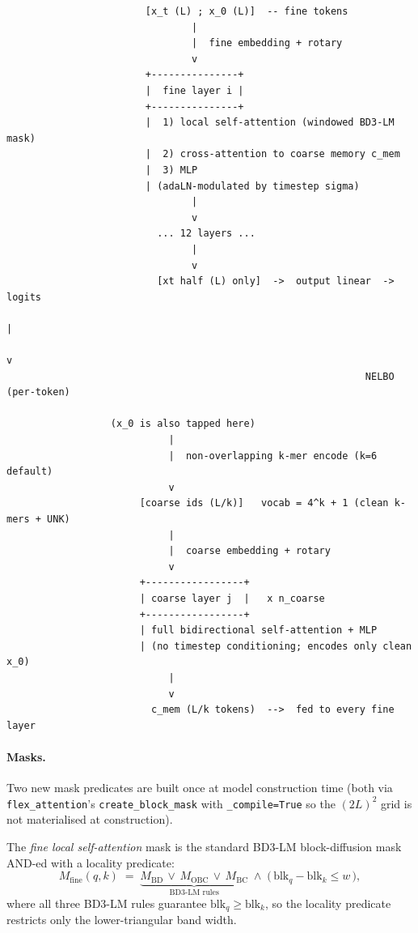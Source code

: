 \documentclass[11pt,a4paper]{article}
\begin{document}
\begin{lstlisting}
                        [x_t (L) ; x_0 (L)]  -- fine tokens
                                |
                                |  fine embedding + rotary
                                v
                        +---------------+
                        |  fine layer i |
                        +---------------+
                        |  1) local self-attention (windowed BD3-LM mask)
                        |  2) cross-attention to coarse memory c_mem
                        |  3) MLP
                        | (adaLN-modulated by timestep sigma)
                                |
                                v
                          ... 12 layers ...
                                |
                                v
                          [xt half (L) only]  ->  output linear  ->  logits
                                                                       |
                                                                       v
                                                              NELBO (per-token)

                  (x_0 is also tapped here)
                            |
                            |  non-overlapping k-mer encode (k=6 default)
                            v
                       [coarse ids (L/k)]   vocab = 4^k + 1 (clean k-mers + UNK)
                            |
                            |  coarse embedding + rotary
                            v
                       +-----------------+
                       | coarse layer j  |   x n_coarse
                       +-----------------+
                       | full bidirectional self-attention + MLP
                       | (no timestep conditioning; encodes only clean x_0)
                            |
                            v
                         c_mem (L/k tokens)  -->  fed to every fine layer
\end{lstlisting}

\paragraph{Masks.} Two new mask predicates are built once at model
construction time (both via \texttt{flex\_attention}'s
\texttt{create\_block\_mask} with \texttt{\_compile=True} so the
\((2L)^2\) grid is not materialised at construction).

The \emph{fine local self-attention} mask is the standard BD3-LM
block-diffusion mask AND-ed with a locality predicate:
\[
M_{\text{fine}}(q,k) \;=\;
\underbrace{
   M_{\text{BD}} \,\vee\, M_{\text{OBC}} \,\vee\, M_{\text{BC}}
 }_{\text{BD3-LM rules}}
\;\wedge\;
\big(\, \mathrm{blk}_q - \mathrm{blk}_k \le w \,\big),
\]
where all three BD3-LM rules guarantee
\(\mathrm{blk}_q \ge \mathrm{blk}_k\), so the locality predicate restricts only
the lower-triangular band width.
\end{document}
